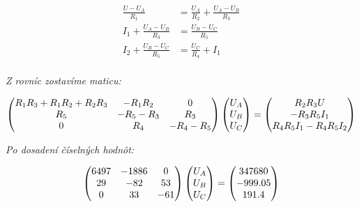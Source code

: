 \begin{equation*}
\begin{aligned}
\frac{U - U_A}{R_1} &= \frac{U_A}{R_2} + \frac{U_A - U_B}{R_3} \\
I_1 + \frac{U_A - U_B}{R_3} &= \frac{U_B - U_C}{R_5} \\
I_2 + \frac{U_B - U_C}{R_5} &= \frac{U_C}{R_4} + I_1 \\
\end{aligned}
\end{equation*}



\clearpage

\textit{Z rovníc zostavíme maticu:}

\begin{equation*}
\centering
\begin{pmatrix}
R_1R_3+R_1R_2+R_2R_3&-R_1R_2&0 \\
R_5&-R_5-R_3&R_3 \\
0&R_4&-R_4-R_5
\end{pmatrix}
\begin{pmatrix}
U_A\\U_B\\U_C\\
\end{pmatrix}
=
\begin{pmatrix}
R_2R_3U\\-R_3R_5I_1\\R_4R_5I_1-R_4R_5I_2\\
\end{pmatrix}
\end{equation*}

\textit{Po dosadení číselných hodnôt:}

\begin{equation*}
\centering
\begin{pmatrix}
6497&-1886&0 \\
29&-82&53 \\
0&33&-61
\end{pmatrix}
\begin{pmatrix}
U_A\\U_B\\U_C\\
\end{pmatrix}
=
\begin{pmatrix}
347680\\-999.05 \\191.4 \\
\end{pmatrix}
\end{equation*}


